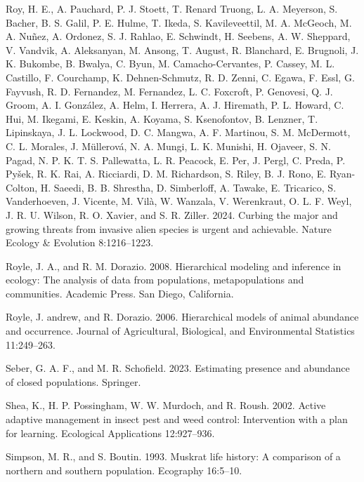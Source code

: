 \documentclass[
  11pt,
  a4paper,
]{article}
\newlength{\cslhangindent}
\newenvironment{CSLReferences}[2] %
 {\begin{list}{}{%
  \setlength{\itemindent}{0pt}
  \setlength{\leftmargin}{0pt}
  \setlength{\parsep}{0pt}
  \ifodd #1
   \setlength{\leftmargin}{\cslhangindent}
   \setlength{\itemindent}{-1\cslhangindent}
  \fi
  \setlength{\itemsep}{#2\baselineskip}}}
 {\end{list}}
\begin{document}
\begin{CSLReferences}{1}{0}
Roy, H. E., A. Pauchard, P. J. Stoett, T. Renard Truong, L. A. Meyerson, S. Bacher, B. S. Galil, P. E. Hulme, T. Ikeda, S. Kavileveettil, M. A. McGeoch, M. A. Nuñez, A. Ordonez, S. J. Rahlao, E. Schwindt, H. Seebens, A. W. Sheppard, V. Vandvik, A. Aleksanyan, M. Ansong, T. August, R. Blanchard, E. Brugnoli, J. K. Bukombe, B. Bwalya, C. Byun, M. Camacho-Cervantes, P. Cassey, M. L. Castillo, F. Courchamp, K. Dehnen-Schmutz, R. D. Zenni, C. Egawa, F. Essl, G. Fayvush, R. D. Fernandez, M. Fernandez, L. C. Foxcroft, P. Genovesi, Q. J. Groom, A. I. González, A. Helm, I. Herrera, A. J. Hiremath, P. L. Howard, C. Hui, M. Ikegami, E. Keskin, A. Koyama, S. Ksenofontov, B. Lenzner, T. Lipinskaya, J. L. Lockwood, D. C. Mangwa, A. F. Martinou, S. M. McDermott, C. L. Morales, J. Müllerová, N. A. Mungi, L. K. Munishi, H. Ojaveer, S. N. Pagad, N. P. K. T. S. Pallewatta, L. R. Peacock, E. Per, J. Pergl, C. Preda, P. Pyšek, R. K. Rai, A. Ricciardi, D. M. Richardson, S. Riley, B. J. Rono, E. Ryan-Colton, H. Saeedi, B. B. Shrestha, D. Simberloff, A. Tawake, E. Tricarico, S. Vanderhoeven, J. Vicente, M. Vilà, W. Wanzala, V. Werenkraut, O. L. F. Weyl, J. R. U. Wilson, R. O. Xavier, and S. R. Ziller. 2024. Curbing the major and growing threats from invasive alien species is urgent and achievable. Nature Ecology \& Evolution 8:1216--1223.

Royle, J. A., and R. M. Dorazio. 2008. Hierarchical modeling and inference in ecology: The analysis of data from populations, metapopulations and communities. Academic Press. San Diego, California.

Royle, J. andrew, and R. Dorazio. 2006. Hierarchical models of animal abundance and occurrence. Journal of Agricultural, Biological, and Environmental Statistics 11:249--263.

Seber, G. A. F., and M. R. Schofield. 2023. Estimating presence and abundance of closed populations. Springer.

Shea, K., H. P. Possingham, W. W. Murdoch, and R. Roush. 2002. Active adaptive management in insect pest and weed control: Intervention with a plan for learning. Ecological Applications 12:927--936.

Simpson, M. R., and S. Boutin. 1993. Muskrat life history: A comparison of a northern and southern population. Ecography 16:5--10.


\end{CSLReferences}
\end{document}
